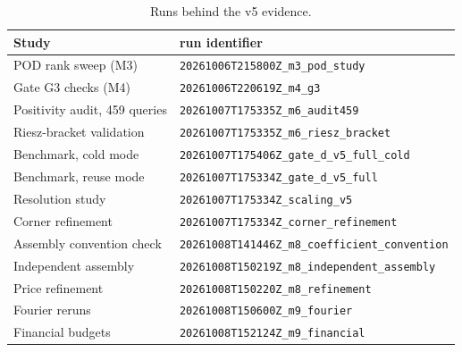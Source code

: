 \documentclass[11pt]{amsart}
\theoremstyle{remark}
\begin{document}
\begin{table}[ht]
\centering\small
\caption{Runs behind the v5 evidence.}
\label{tab:runs}
\begin{tabular}{ll}
\toprule
Study & run identifier\\
\midrule
POD rank sweep (M3) & \texttt{20261006T215800Z\_m3\_pod\_study}\\
Gate G3 checks (M4) & \texttt{20261006T220619Z\_m4\_g3}\\
Positivity audit, 459 queries & \texttt{20261007T175335Z\_m6\_audit459}\\
Riesz-bracket validation & \texttt{20261007T175335Z\_m6\_riesz\_bracket}\\
Benchmark, cold mode & \texttt{20261007T175406Z\_gate\_d\_v5\_full\_cold}\\
Benchmark, reuse mode & \texttt{20261007T175334Z\_gate\_d\_v5\_full}\\
Resolution study & \texttt{20261007T175334Z\_scaling\_v5}\\
Corner refinement & \texttt{20261007T175334Z\_corner\_refinement}\\
Assembly convention check & \texttt{20261008T141446Z\_m8\_coefficient\_convention}\\
Independent assembly & \texttt{20261008T150219Z\_m8\_independent\_assembly}\\
Price refinement & \texttt{20261008T150220Z\_m8\_refinement}\\
Fourier reruns & \texttt{20261008T150600Z\_m9\_fourier}\\
Financial budgets & \texttt{20261008T152124Z\_m9\_financial}\\
\bottomrule
\end{tabular}
\end{table}

\end{document}
